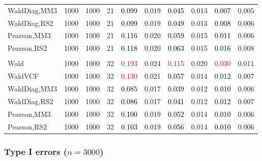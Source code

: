 \documentclass[
]{article}
\begin{document}
\begin{table}[H]
{\begin{tabular}[t]{lrrrrrrlrr}
\hspace{1em}WaldDiag,MM3 & 1000 & 1000 & 21 & \textcolor{black}{0.099} & 0.019 & \textcolor{black}{0.045} & 0.013 & \textcolor{black}{0.007} & 0.005\\
\hspace{1em}WaldDiag,RS2 & 1000 & 1000 & 21 & \textcolor{black}{0.099} & 0.019 & \textcolor{black}{0.049} & 0.013 & \textcolor{black}{0.008} & 0.006\\
\hspace{1em}Pearson,MM3 & 1000 & 1000 & 21 & \textcolor{black}{0.116} & 0.020 & \textcolor{black}{0.059} & 0.015 & \textcolor{black}{0.011} & 0.006\\
\hspace{1em}Pearson,RS2 & 1000 & 1000 & 21 & \textcolor{black}{0.118} & 0.020 & \textcolor{black}{0.063} & 0.015 & \textcolor{black}{0.016} & 0.008\\
\addlinespace[0.3em]
\multicolumn{10}{l}{\textbf{3F 15V}}\\
\hspace{1em}Wald & 1000 & 1000 & 32 & \textcolor{red}{0.193} & 0.024 & \textcolor{red}{0.115} & 0.020 & \textcolor{red}{0.030} & 0.011\\
\hspace{1em}WaldVCF & 1000 & 1000 & 32 & \textcolor{red}{0.130} & 0.021 & \textcolor{black}{0.057} & 0.014 & \textcolor{black}{0.012} & 0.007\\
\hspace{1em}WaldDiag,MM3 & 1000 & 1000 & 32 & \textcolor{black}{0.085} & 0.017 & \textcolor{black}{0.039} & 0.012 & \textcolor{black}{0.010} & 0.006\\
\hspace{1em}WaldDiag,RS2 & 1000 & 1000 & 32 & \textcolor{black}{0.086} & 0.017 & \textcolor{black}{0.041} & 0.012 & \textcolor{black}{0.012} & 0.007\\
\hspace{1em}Pearson,MM3 & 1000 & 1000 & 32 & \textcolor{black}{0.100} & 0.019 & \textcolor{black}{0.052} & 0.014 & \textcolor{black}{0.010} & 0.006\\
\hspace{1em}Pearson,RS2 & 1000 & 1000 & 32 & \textcolor{black}{0.103} & 0.019 & \textcolor{black}{0.056} & 0.014 & \textcolor{black}{0.010} & 0.006\\
\bottomrule
\end{tabular}}
\endgroup{}
\end{table}

\hypertarget{type-i-errors-n3000-2}{%
\subsubsection{\texorpdfstring{Type I errors
(\(n=3000\))}{Type I errors (n=3000)}}\label{type-i-errors-n3000-2}}
\end{document}
